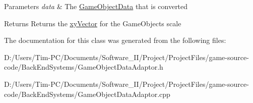\begin{DoxyParams}{Parameters}
{\em data} & The \hyperlink{struct_game_object_data}{Game\+Object\+Data} that is converted \\
\hline
\end{DoxyParams}
\begin{DoxyReturn}{Returns}
Returns the \hyperlink{structxy_vector}{xy\+Vector} for the Game\+Objects scale 
\end{DoxyReturn}


The documentation for this class was generated from the following files\+:\begin{DoxyCompactItemize}
\item 
D\+:/\+Users/\+Tim-\/\+P\+C/\+Documents/\+Software\+\_\+\+I\+I/\+Project/\+Project\+Files/game-\/source-\/code/\+Back\+End\+Systems/Game\+Object\+Data\+Adaptor.\+h\item 
D\+:/\+Users/\+Tim-\/\+P\+C/\+Documents/\+Software\+\_\+\+I\+I/\+Project/\+Project\+Files/game-\/source-\/code/\+Back\+End\+Systems/Game\+Object\+Data\+Adaptor.\+cpp\end{DoxyCompactItemize}
